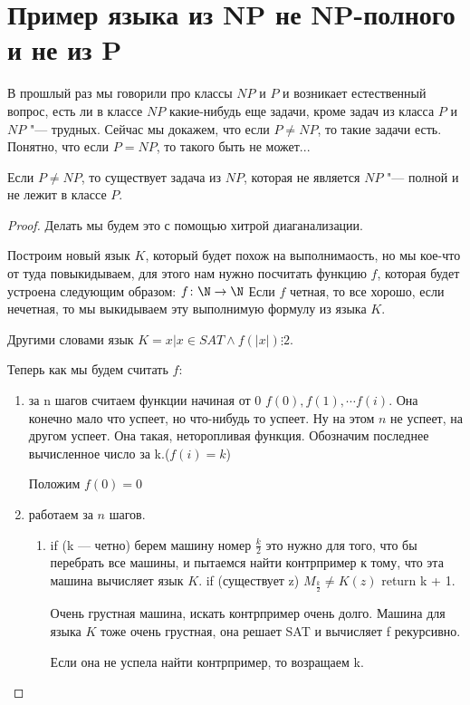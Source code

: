 ﻿\section{Пример языка из NP не NP-полного и не из P}
В прошлый раз мы говорили про классы $NP$ и $P$ и 
возникает естественный вопрос, есть ли в классе 
$NP$ какие-нибудь еще задачи, кроме задач из 
класса $P$ и $NP$ "--- трудных. Сейчас мы докажем, 
что если $P \ne NP$, то такие задачи есть. Понятно, что
если $P = NP$, то такого быть не может...
\begin{theorem}
Если $P \ne NP$, то 
существует задача из $NP$, которая не 
является $NP$ "--- полной и не лежит в классе $P$.
\end{theorem}
\begin{proof}
Делать мы будем это с помощью хитрой диаганализации.

Построим новый язык $K$, который будет похож на 
выполнимаость, но мы кое-что от туда повыкидываем, 
для этого нам нужно посчитать функцию $f$, которая 
будет устроена следующим образом:
$f\colon \N \to \N$  
Если $f$ четная, то все хорошо, если нечетная, 
то мы выкидываем эту выполнимую формулу из языка $K$.

Другими словами язык $K = {x | x \in SAT \wedge f(|x|) \vdots 2}$.

Теперь как мы будем считать $f$:
\begin{enumerate}
    \item за n шагов считаем функции начиная от 0 $f(0), f(1), \cdots f(i)$. 
    Она конечно мало что успеет, но что-нибудь то успеет. Ну на этом $n$ не 
    успеет, на другом успеет. Она такая, неторопливая функция. Обозначим 
    последнее вычисленное число за k.($f(i) = k$)
    
    Положим $f(0) = 0$\\
    \item работаем за $n$ шагов. 
    \begin{enumerate}
    \item if (k --- четно) берем машину номер $\frac{k}{2}$ это нужно для 
    того, что бы перебрать все машины, и пытаемся найти контрпример к тому, 
    что эта машина вычисляет язык $K$. if (существует z) $M_{\frac{k}{2}} \ne K(z)$  return k + 1. 

    Очень грустная машина, искать контрпример очень долго. Машина для языка $K$ тоже 
    очень грустная, она решает SAT и вычисляет f рекурсивно. 

    Если она не успела найти контрпример, то возращаем k. 
    

\end{enumerate}
\end{enumerate}
\end{proof}
